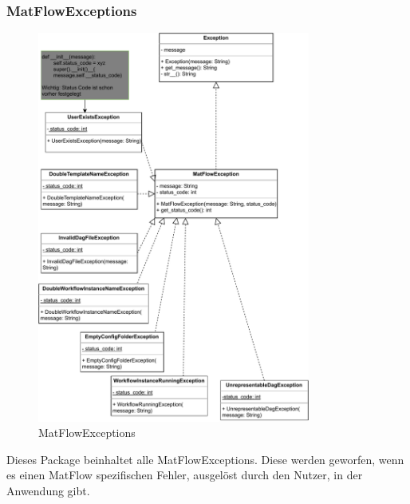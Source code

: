 \FloatBarrier
\newpage

\subsubsection{MatFlowExceptions}
\begin{figure}[h!]
    \includegraphics[width=0.8\textwidth]{res/Klassen/MatFlowExceptions.drawio.pdf}
    \caption{MatFlowExceptions}
\end{figure}
Dieses Package beinhaltet alle MatFlowExceptions. Diese werden geworfen, wenn es einen MatFlow spezifischen Fehler, ausgelöst 
durch den Nutzer, in der Anwendung gibt.

\FloatBarrier
\newpage